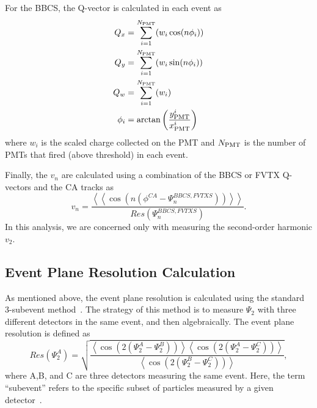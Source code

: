 For the BBCS, the Q-vector is calculated in each event as
\begin{align}
Q_x &= \sum^{N_{\rm PMT}}_{i=1}( w_i \cos(n\phi_i)) \\
Q_y &= \sum^{N_{\rm PMT}}_{i=1}( w_i \sin(n\phi_i)) \\
Q_w &= \sum^{N_{\rm PMT}}_{i=1}( w_i ) \\
\phi_i &= \arctan\left(\frac{y^i_{\rm PMT}}{x^i_{\rm PMT}}\right) 
\label{eqn:bbc_ep_eqns}
\end{align}
where $w_i$ is the scaled charge collected on the PMT and $N_{\rm PMT}$ is the number of PMTs that fired (above threshold) in each event.

Finally, the $v_n$ are calculated using a combination of the BBCS or FVTX Q-vectors and the CA tracks as
\begin{equation}
v_n = \frac{\left<\left<\cos(n(\phi^{CA} - \Psi^{BBCS,FVTXS}_n))\right>\right>}{Res(\Psi^{BBCS,FVTXS}_n)}.
\end{equation}
In this analysis, we are concerned only with measuring the second-order harmonic $v_2$.

\subsection{Event Plane Resolution Calculation}%
As mentioned above, the event plane resolution is calculated using the standard 3-subevent method~\cite{PhysRevC.58.1671}. The strategy of this method is to measure $\Psi_2$ with three different detectors in the same event, and then algebraically. The event plane resolution is defined as
\begin{equation}
Res(\Psi_2^A) = \sqrt{\frac{\left<\cos(2(\Psi_2^A - \Psi_2^B))\right>\left<\cos(2(\Psi_2^A - \Psi_2^C))\right>}{\left<\cos(2(\Psi_2^B - \Psi_2^C))\right>}},
\label{eqn:res}
\end{equation}
where A,B, and C are three detectors measuring the same event. Here, the term ``subevent'' refers to the specific subset of particles measured by a given detector~\cite{PhysRevC.58.1671}.

